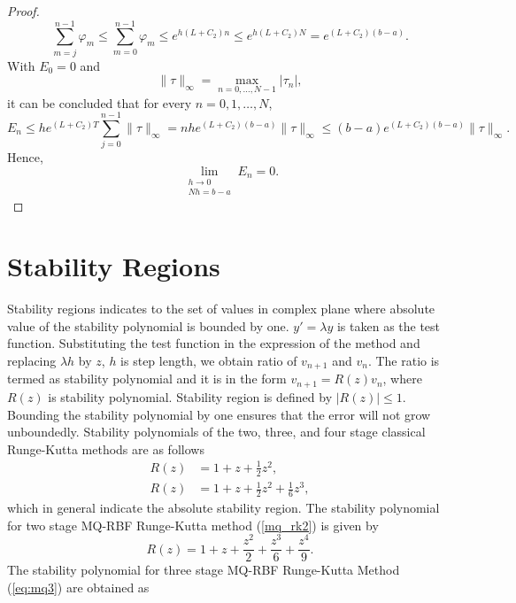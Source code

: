 \documentclass[a4paper, preprint,11pt]{elsarticle}
\numberwithin{equation}{section}
\begin{document}
\begin{proof}
\begin{equation*}
    \sum_{m=j}^{n-1} \varphi_m \leq \sum_{m=0}^{n-1} \varphi_m \leq e^{h(L + C_2) n} \leq e^{h(L + C_2) N} = e^{(L + C_2)(b - a)}.
\end{equation*}
With \( E_0 = 0 \) and
\[
\|\tau\|_\infty = \max_{n = 0, \dots, N-1} |\tau_n|,
\]
it can be concluded that for every \( n = 0, 1, \dots, N \),
\begin{equation*}
    E_n \leq h e^{(L + C_2) T} \sum_{j=0}^{n-1} \|\tau\|_\infty = n h e^{(L + C_2)(b - a)} \|\tau\|_\infty \leq (b - a) e^{(L + C_2)(b - a)} \|\tau\|_\infty.
\end{equation*}
Hence,
\begin{equation*}
\lim_{\substack{h \to 0 \\ N h = b - a}} E_n = 0.
\end{equation*}
\end{proof}
\section{Stability Regions} 
Stability regions indicates to the set of values in complex plane where absolute value of the stability polynomial is bounded by one. $y' = \lambda y $ is taken as the test function. Substituting the test function in the expression of the method and replacing  $\lambda h$ by $ z $, $h$ is step length, we obtain ratio of $v_{n+1}$ and $v_n$. The ratio is termed as stability polynomial and it is in the form $v_{n+1} = R(z)v_n $, where $R(z)$ is stability polynomial. Stability region is defined by $|R(z)| \leq 1 $. Bounding the stability polynomial by one ensures that the error will not grow unboundedly. 
Stability polynomials of the two, three, and four stage classical Runge-Kutta methods are as follows
\begin{align}
    R(z) &= 1 + z + \frac{1}{2}z^2, \\
    R(z) &= 1 + z + \frac{1}{2}z^2 + \frac{1}{6}z^3, 
\end{align}
which in general indicate the absolute stability region. The stability polynomial for two stage MQ-RBF Runge-Kutta method (\ref{mq_rk2}) is given by 
\begin{equation*}
    R(z) = 1 + z + \frac{z^2}{2} + \frac{z^3}{6} + \frac{z^4}{9}.
\end{equation*}
The stability polynomial for three stage MQ-RBF Runge-Kutta Method (\ref{eq:mq3}) are obtained as
\end{document}
